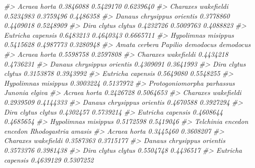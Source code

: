 \documentclass[
]{article}
\newenvironment{Shaded}{\begin{snugshade}}{\end{snugshade}}
\newcommand{\CommentTok}[1]{\textcolor[rgb]{0.56,0.35,0.01}{\textit{#1}}}
\begin{document}
\begin{Shaded}
\begin{Highlighting}[]
\CommentTok{\#\textgreater{} Acraea horta                       0.3846088        0.5429170      0.6239640}
\CommentTok{\#\textgreater{} Charaxes wakefieldi                0.5234983        0.3759496      0.4486358}
\CommentTok{\#\textgreater{} Danaus chrysippus orientis         0.3778860        0.4409018      0.5248909}
\CommentTok{\#\textgreater{} Dira clytus clytus                 0.4232726        0.5009763      0.4088823}
\CommentTok{\#\textgreater{} Eutricha capensis                  0.6483213        0.4640343      0.6665711}
\CommentTok{\#\textgreater{} Hypolimnas misippus                0.5415628        0.4987773      0.3280948}
\CommentTok{\#\textgreater{}                            Amata cerbera Papilio demodocus demodocus}
\CommentTok{\#\textgreater{} Acraea horta                   0.5598758                   0.2597808}
\CommentTok{\#\textgreater{} Charaxes wakefieldi            0.4434218                   0.4736231}
\CommentTok{\#\textgreater{} Danaus chrysippus orientis     0.4309091                   0.3641993}
\CommentTok{\#\textgreater{} Dira clytus clytus             0.3153878                   0.3943992}
\CommentTok{\#\textgreater{} Eutricha capensis              0.5649080                   0.5548255}
\CommentTok{\#\textgreater{} Hypolimnas misippus            0.3003224                   0.5137972}
\CommentTok{\#\textgreater{}                            Protogoniomorpha parhassus Junonia elgiva}
\CommentTok{\#\textgreater{} Acraea horta                                0.2426728      0.5064653}
\CommentTok{\#\textgreater{} Charaxes wakefieldi                         0.2939509      0.4144333}
\CommentTok{\#\textgreater{} Danaus chrysippus orientis                  0.4670588      0.3927294}
\CommentTok{\#\textgreater{} Dira clytus clytus                          0.4302457      0.5739214}
\CommentTok{\#\textgreater{} Eutricha capensis                           0.4608644      0.4685654}
\CommentTok{\#\textgreater{} Hypolimnas misippus                         0.5172598      0.5419046}
\CommentTok{\#\textgreater{}                            Telchinia encedon encedon Rhodogastria amasis}
\CommentTok{\#\textgreater{} Acraea horta                               0.3445460           0.3608207}
\CommentTok{\#\textgreater{} Charaxes wakefieldi                        0.3587363           0.3715177}
\CommentTok{\#\textgreater{} Danaus chrysippus orientis                 0.3573376           0.3981438}
\CommentTok{\#\textgreater{} Dira clytus clytus                         0.5504748           0.4436517}
\CommentTok{\#\textgreater{} Eutricha capensis                          0.4639129           0.5307252}

\end{Highlighting}
\end{Shaded}
\end{document}
